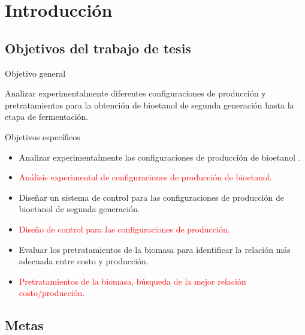 \documentclass[12pt]{article}
\begin{document}
	
	
	\tableofcontents
	\date{}
     \newpage
	\listoftables
	\newpage
		\section{Introducción}
	
		
		
		
	\subsection{Objetivos del trabajo de tesis}
	{\large Objetivo general}
	
	Analizar experimentalmente diferentes configuraciones de producción y pretratamientos para la obtención de bioetanol de segunda generación  hasta la etapa de fermentación. \newline \newline
	
	{\large Objetivos específicos}
	
	\begin{itemize}
		\item 
		Analizar experimentalmente las configuraciones de producción de bioetanol .
		\item \textcolor{red}{Análisis experimental de configuraciones de producción de bioetanol.}
		\item 
		Diseñar un sistema de control para las configuraciones de producción de bioetanol de segunda generación.
			
		\item \textcolor{red}{Diseño de control para las configuraciones de producción.}
		
		\item 
       Evaluar los pretratamientos de la biomasa para identificar la relación más adecuada entre costo y producción.
      \item \textcolor{red}{Pretratamientos de la biomasa, búsqueda de la mejor relación costo/producción.}
	\end{itemize}
	
	\subsection{Metas}
	
\end{document}
